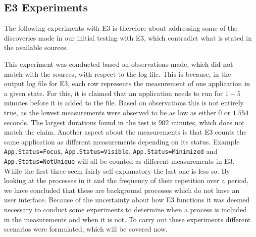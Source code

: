 \subsection{E3 Experiments}

The following experiments with E3 is therefore about addressing some of the discoveries made in our initial testing with E3, which  contradict what is stated in the available sources\cite[]{E3Doc,E3Video,E3WinHec}. 

This experiment was conducted based on observations made, which did not match with the sources, with respect to the log file. This is because, in the output log file for E3, each row represents the measurement of one application in a given state. For this, it is claimed that an application needs to run for $1-5$ minutes before it is added to the file. Based on observations this is not entirely true, as the lowest measurements were observed to be as low as either $0$ or $1.554$ seconds. The largest durations found in the test is $902$ minutes, which does not match the claim. Another aspect about the measurements is that E3 counts the same application as different measurements depending on its status.
Example \texttt{App.Status=Focus}, \texttt{App.Status=Visible}, \texttt{App.Status=Minimized} and \texttt{App.Status=NotUnique} will all be counted as different measurements in E3. While the first three seem fairly self-explanatory the last one is less so. By looking at the processes in it and the frequency of their repetition over a period, we have concluded that these are background processes which do not have an user interface. 
Because of the uncertainty about how E3 functions it was deemed necessary to conduct some experiments to determine when a process is included in the measurements and when it is not. To carry out these experiments different scenarios were formulated, which will be covered now.

